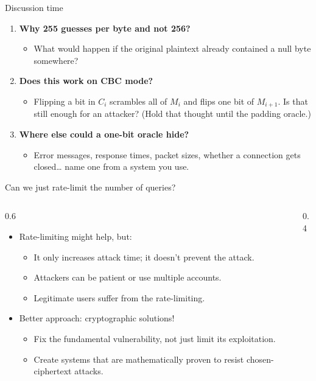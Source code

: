\ifdefined\PRESENTATION\else\PassOptionsToClass{handout}{beamer}\fi\documentclass[aspectratio=169, lualatex]{beamer}
\begin{document}
\begin{frame}{Discussion time}
	\begin{enumerate}
		\item \textbf{Why 255 guesses per byte and not 256?}
		      \begin{itemize}
			      \item What would happen if the original plaintext already contained a null byte somewhere?
		      \end{itemize}
		\item \textbf{Does this work on CBC mode?}
		      \begin{itemize}
			      \item Flipping a bit in $C_i$ scrambles all of $M_i$ and flips one bit of $M_{i+1}$. Is that still enough for an attacker? (Hold that thought until the padding oracle.)
		      \end{itemize}
		\item \textbf{Where else could a one-bit oracle hide?}
		      \begin{itemize}
			      \item Error messages, response times, packet sizes, whether a connection gets closed\ldots{} name one from a system you use.
		      \end{itemize}
	\end{enumerate}
\end{frame}

\begin{frame}{Can we just rate-limit the number of queries?}
	\begin{columns}[c]
		\begin{column}{0.6\textwidth}
			\begin{itemize}
				\item Rate-limiting might help, but:
				      \begin{itemize}
					      \item It only increases attack time; it doesn't prevent the attack.
					      \item Attackers can be patient or use multiple accounts.
					      \item Legitimate users suffer from the rate-limiting.
				      \end{itemize}
				\item Better approach: cryptographic solutions!
				      \begin{itemize}
					      \item Fix the fundamental vulnerability, not just limit its exploitation.
					      \item Create systems that are mathematically proven to resist chosen-ciphertext attacks.
				      \end{itemize}
			\end{itemize}
		\end{column}
		\begin{column}{0.4\textwidth}
		\end{column}
	\end{columns}
\end{frame}
\end{document}
